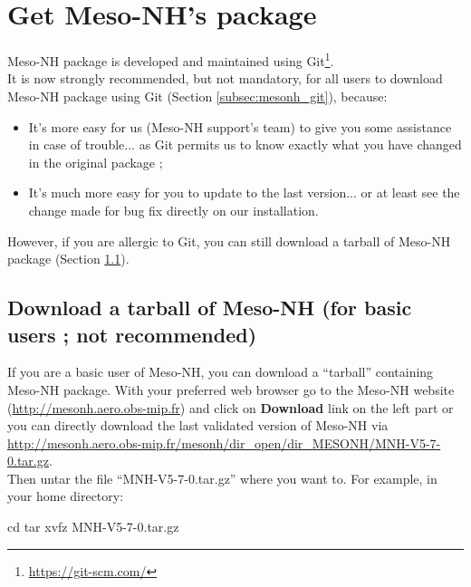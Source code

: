 \section{Get Meso-NH's package}
\label{sec:get_mesonh_package}

Meso-NH package is developed and maintained using Git\footnote{\href{https://git-scm.com/}{https://git-scm.com/}}. \\

It is now strongly recommended, but not mandatory, for all users to download Meso-NH package using Git (Section \ref{subsec:mesonh_git}), because:
\begin{itemize}
\item It's more easy for us (Meso-NH support's team) to give you some assistance in case of trouble... as Git permits us to know exactly what you have changed in the original package ;
\item It's much more easy for you to update to the last version...  or at least see the change made for bug fix directly on our installation.
\end{itemize}

However, if you are allergic to Git, you can still download a tarball of Meso-NH package (Section \ref{subsec:mesonh_tar}).

\subsection{Download a tarball of Meso-NH (for basic users ; not recommended)}
\label{subsec:mesonh_tar}

If you are a basic user of Meso-NH, you can download a ``tarball'' containing Meso-NH package. With your preferred web browser go to the Meso-NH website (\href{http://mesonh.aero.obs-mip.fr/mesonh}{http://mesonh.aero.obs-mip.fr}) and click on \textbf{Download} link on the left part or you can directly download the last validated version of Meso-NH via \href{http://mesonh.aero.obs-mip.fr/mesonh/dir_open/dir_MESONH/MNH-V5-7-0.tar.gz}{http://mesonh.aero.obs-mip.fr/mesonh/dir\_open/dir\_MESONH/MNH-V5-7-0.tar.gz}. \\

Then untar the file ``MNH-V5-7-0.tar.gz'' where you want to.
For example, in your home directory:
\begin{bashcode}
cd
tar xvfz MNH-V5-7-0.tar.gz
\end{bashcode}

